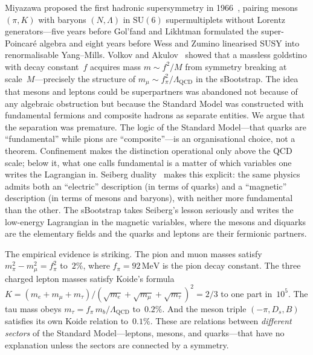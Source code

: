 \documentclass[aps,prd,twocolumn,showpacs,preprintnumbers,superscriptaddress]{revtex4-2}
\newcommand{\SU}{\mathrm{SU}}
\newcommand{\MeV}{\,\mathrm{MeV}}
\newcommand{\Lqcd}{\Lambda_{\mathrm{QCD}}}
\begin{document}
Miyazawa proposed the first hadronic supersymmetry in
1966~\cite{Miyazawa:1966}, pairing mesons $(\pi, K)$ with
baryons $(N, \Lambda)$ in $\SU(6)$ supermultiplets without
Lorentz generators---five years before Gol'fand and Likhtman
formulated the super-Poincar\'e algebra and eight years before
Wess and Zumino linearised SUSY into renormalisable Yang--Mills.
Volkov and Akulov~\cite{VolkovAkulov:1973} showed that a
massless goldstino with decay constant~$f$ acquires mass
$m \sim f^2/M$ from symmetry breaking at scale~$M$---precisely
the structure of $m_\mu \sim f_\pi^2/\Lqcd$ in the sBootstrap.
The idea that mesons and leptons could be superpartners was
abandoned not because of any algebraic obstruction but because
the Standard Model was constructed with fundamental fermions
and composite hadrons as separate entities.
We argue that the separation was premature.
The logic of the Standard Model---that quarks are
``fundamental'' while pions are ``composite''---is an
organisational choice, not a theorem.  Confinement makes
the distinction operational only above the QCD scale; below
it, what one calls fundamental is a matter of which
variables one writes the Lagrangian in.  Seiberg
duality~\cite{Seiberg:1995} makes this explicit: the same
physics admits both an ``electric'' description (in terms of
quarks) and a ``magnetic'' description (in terms of mesons
and baryons), with neither more fundamental than the other.
The sBootstrap takes Seiberg's lesson seriously and writes
the low-energy Lagrangian in the magnetic variables, where
the mesons and diquarks are the elementary fields and the
quarks and leptons are their fermionic partners.

The empirical evidence is striking.  The pion and muon masses
satisfy $m_\pi^2 - m_\mu^2 = f_\pi^2$ to~$2\%$, where $f_\pi =
92\MeV$ is the pion decay constant.  The three charged lepton
masses satisfy Koide's formula~\cite{Koide:1983}
$K = (m_e + m_\mu + m_\tau)/(\sqrt{m_e}+\sqrt{m_\mu}+\sqrt{m_\tau})^2
= 2/3$ to one part in~$10^5$.  The tau mass obeys
$m_\tau = f_\pi\,m_b/\Lqcd$ to~$0.2\%$.  And the meson triple
$(-\pi, D_s, B)$ satisfies its own Koide relation to~$0.1\%$.
These are relations between \emph{different sectors} of the
Standard Model---leptons, mesons, and quarks---that have no
explanation unless the sectors are connected by a symmetry.
\end{document}
